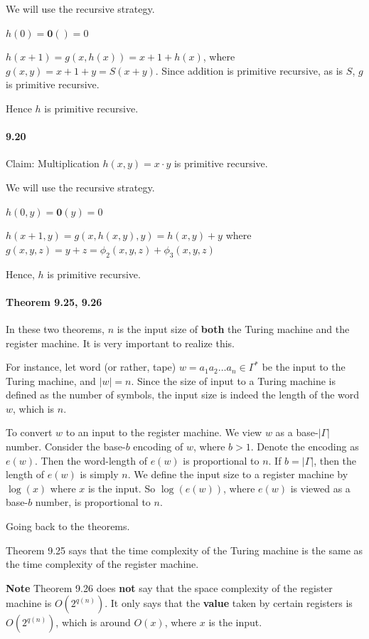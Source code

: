 \documentclass{article}
\begin{document}
We will use the recursive strategy.

$h(0) = \mathbf{0}() = 0$

$h(x+1) = g(x, h(x)) = x+1+h(x)$, where $g(x,y) = x+1+y = S(x+y)$. Since addition is primitive recursive, as is $S$, $g$ is primitive recursive.

Hence $h$ is primitive recursive.

\paragraph{9.20} Claim: Multiplication $h(x,y)=x\cdot y$ is primitive recursive.

We will use the recursive strategy.

$h(0, y) = \mathbf{0}(y) = 0$

$h(x+1, y) = g(x, h(x, y), y) = h(x,y) + y$ where $g(x,y,z) = y+z = \phi_2(x,y,z) + \phi_3(x,y,z)$

Hence, $h$ is primitive recursive.

\paragraph{Theorem 9.25, 9.26}
In these two theorems, $n$ is the input size of \textbf{both} the Turing machine and the register machine. It is very important to realize this.

For instance, let word (or rather, tape) $w=a_1a_2\dots a_n\in \Gamma^*$ be the input to the Turing machine, and $|w|=n$. Since the size of input to a Turing machine is defined as the number of symbols, the input size is indeed the length of the word $w$, which is $n$.

To convert $w$ to an input to the register machine. We view $w$ as a base-$|\Gamma|$ number. Consider the base-$b$ encoding of $w$, where $b>1$. Denote the encoding as $e(w)$. Then the word-length of $e(w)$ is proportional to $n$. If $b=|\Gamma|$, then the length of $e(w)$ is simply $n$. We define the input size to a register machine by $\log(x)$ where $x$ is the input. So $\log(e(w))$, where $e(w)$ is viewed as a base-$b$ number, is proportional to $n$.

Going back to the theorems.

Theorem 9.25 says that the time complexity of the Turing machine is the same as the time complexity of the register machine.

\textbf{Note} Theorem 9.26 does \textbf{not} say that the space complexity of the register machine is $O(2^{q(n)})$. It only says that the \textbf{value} taken by certain registers is $O(2^{q(n)})$, which is around $O(x)$, where $x$ is the input.
\end{document}
